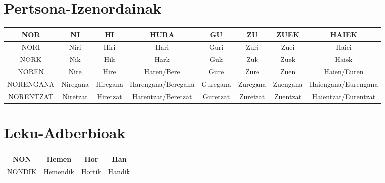 \documentclass[12pt, a4paper, landscape]{article}
\begin{document}
\section{Pertsona-Izenordainak}
\begin{table}[h]
\begin{center}
\begin{tabular}{|c|c|c|c|c|c|c|c|}
\hline
NOR & NI & HI & HURA & GU & ZU & ZUEK & HAIEK \\ 
\hline
NORI & Niri & Hiri & Hari & Guri & Zuri & Zuei & Haiei \\
\hline
NORK & Nik & Hik & Hark & Guk & Zuk & Zuek & Haiek \\
\hline
NOREN & Nire & Hire & Haren/Bere & Gure & Zure & Zuen & Haien/Euren \\
\hline
NORENGANA & Niregana & Hiregana & Harengana/Beregana & Guregana & Zuregana & Zuengana & Haiengana/Eurengana \\
\hline
NORENTZAT & Niretzat & Hiretzat & Harentzat/Beretzat & Guretzat & Zuretzat & Zuentzat & Haientzat/Eurentzat \\
\hline
\end{tabular}
\end{center}
\end{table}
\newpage

\section{Leku-Adberbioak}
\begin{table}[h]
\begin{center}
\begin{tabular}{|c|c|c|c|}
\hline
NON & Hemen & Hor & Han \\
\hline
NONDIK & Hemendik & Hortik & Handik \\
\hline
\end{tabular}
\end{center}
\end{table}
\newpage
\end{document}
